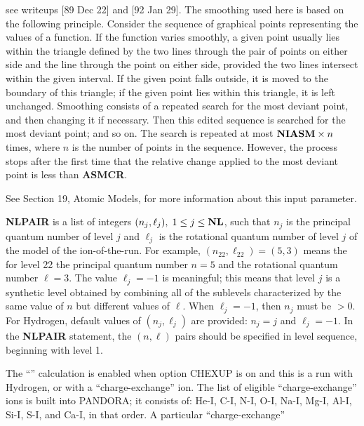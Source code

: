 see writeups [89 Dec 22] and [92 Jan 29]. The smoothing
used here is based on the following principle. Consider the sequence
of graphical points representing the values of a function. If the function
varies smoothly, a given point usually lies within the triangle 
defined by the two lines through the pair of points on either side
and the line through the point on either side, provided the two lines
intersect within the given interval. If the given point falls outside,
it is moved to the boundary of this triangle; if the given point lies
within this triangle, it is left unchanged. \np
Smoothing consists of a repeated search for the most deviant point,
and then changing it if necessary. Then this edited sequence is searched
for the most deviant point; and so on. The search is repeated at most
{${\bf NIASM} \times n$} times, where $n$ is the number of points
in the sequence. However, the process stops after the first time that
the relative change applied to the most deviant point is less than
{\bf ASMCR}.
\ej
\centerline{}
\space \noindent
See Section 19, Atomic Models, for more information about this input
parameter.
\blankline
\blankline
\centerline{}
\space \noindent
{\bf NLPAIR} is a list of integers $(n_j, \ell_j), \; 1 \leq j \leq 
{\bf NL}$, such that $n_j$ is the principal quantum number of level $j$
and $\ell_j$ is the rotational quantum number of level $j$ of the
model of the ion-of-the-run. For example, $(n_{22}, \ell_{22}) = (5, 3)$
means the for level 22 the principal quantum number $n = 5$ and the
rotational quantum number $\ell = 3$. \np
The value $\ell_j = -1$ is meaningful; this means that level $j$ is a
synthetic level obtained by combining all of the sublevels characterized
by the same value of $n$ but different values of $\ell$. \np
When $\ell_j = -1$, then $n_j$ must be $> 0$. For
Hydrogen, default values of $(n_j, \ell_j)$ are provided: $n_j = j$
and $\ell_j = -1$. \np
In the {\bf NLPAIR} statement, the $(n, \ell)$ pairs should be specified
in level sequence, beginning with level 1.
\blankline
\blankline
\centerline{}
\space \noindent
The ``'' calculation 
is enabled when option CHEXUP is on and this is a run with Hydrogen, or
with a ``charge-exchange'' ion. The list of eligible ``charge-exchange'' ions
is built into PANDORA; it consists of: He-I, C-I, N-I, O-I, Na-I, Mg-I,
Al-I, Si-I, S-I, and \break Ca-I, in that order. A particular ``charge-exchange''
